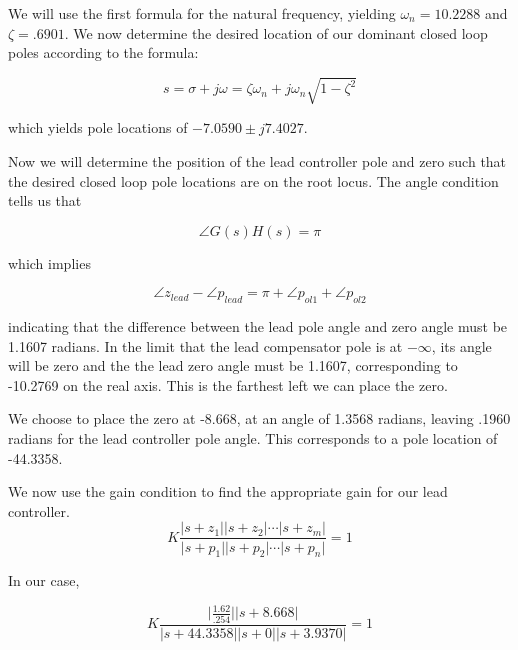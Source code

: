 \documentclass[11pt,a4paper]{article}
\begin{document}
We will use the first formula for the natural frequency, yielding $\omega_{n} = 10.2288$ and $\zeta = .6901$. We now determine the desired location of our dominant closed loop poles according to the formula: 

\begin{equation}
	s = \sigma + j \omega = \zeta \omega_{n} + j \omega_{n} \sqrt{1 - \zeta^{2}}
\end{equation}

which yields pole locations of $ -7.0590 \pm j 7.4027$. 

Now we will determine the position of the lead controller pole and zero such that the desired closed loop pole locations are on the root locus. The angle condition tells us that

\begin{equation}
	\angle G(s)H(s) = \pi
\end{equation}

which implies

\begin{equation}
	\angle z_{lead} - \angle p_{lead}   =  \pi + \angle p_{ol1} + \angle p_{ol2}
\end{equation}

indicating that the difference between the lead pole angle and zero angle must be 1.1607 radians. In the limit that the lead compensator pole is at $-\infty$, its angle will be zero and the the lead zero angle must be 1.1607, corresponding to -10.2769 on the real axis. This is the farthest left we can place the zero.

 We choose to place the zero at -8.668, at an angle of 1.3568 radians, leaving .1960 radians for the lead controller pole angle. This corresponds to a pole location of -44.3358.

We now use the gain condition to find the appropriate gain for our lead controller. 
\begin{equation}
	K \frac{\lvert s + z_{1} \rvert \lvert s + z_{2} \rvert \cdots \lvert s + z_{m} \rvert }{\lvert s + p_{1} \rvert \lvert s + p_{2} \rvert \cdots \lvert s + p_{n} \rvert} = 1
\end{equation}

In our case,

\begin{equation}
	K \frac{\lvert \frac{1.62}{.254} \rvert \lvert s + 8.668 \rvert}{ \lvert s + 44.3358 \rvert \lvert s + 0 \rvert  \lvert s + 3.9370 \rvert} = 1
\end{equation}
 
\end{document}
